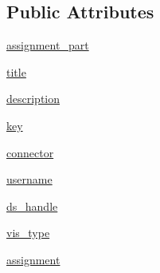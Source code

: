 \subsection*{Public Attributes}
\begin{DoxyCompactItemize}
\item 
\hyperlink{class_bridges_1_1_bridges_1_1_bridges_ae654b7f3bf01b66a13e72035309502c5}{assignment\+\_\+part}
\item 
\hyperlink{class_bridges_1_1_bridges_1_1_bridges_a977ab3147c2a675bfd78dd199a9644ec}{title}
\item 
\hyperlink{class_bridges_1_1_bridges_1_1_bridges_a11a96ac7da5095bbbe357c67521660b5}{description}
\item 
\hyperlink{class_bridges_1_1_bridges_1_1_bridges_aa9cbb19b029f0c5257f4a605e8de1097}{key}
\item 
\hyperlink{class_bridges_1_1_bridges_1_1_bridges_a0101c37e64215a6ef4923bd8fc4339e1}{connector}
\item 
\hyperlink{class_bridges_1_1_bridges_1_1_bridges_a65b7ea93a38533a0f875e5f3e5d80caf}{username}
\item 
\hyperlink{class_bridges_1_1_bridges_1_1_bridges_afee10c9edbc16626444a67f5aa847593}{ds\+\_\+handle}
\item 
\hyperlink{class_bridges_1_1_bridges_1_1_bridges_aea9edc834f1fc1dcfb1ca53d82eba33a}{vis\+\_\+type}
\item 
\hyperlink{class_bridges_1_1_bridges_1_1_bridges_a33719976eb816d13f632e9342d31b718}{assignment}
\end{DoxyCompactItemize}
